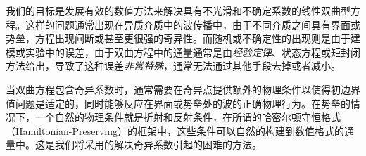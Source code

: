我们的目标是发展有效的数值方法来解决具有不光滑和不确定系数的线性双曲型方程。这样的问题通常出现在异质介质中的波传播中，由于不同介质之间具有界面或势垒，方程出现间断或甚至更很强的奇异性。而随机或不确定性的出现则是由于建模或实验中的误差，由于双曲方程中的通量通常是由{\it 经验定律}、状态方程或矩封闭方法给出，导致了这种误差{\it 非常特殊}，通常无法通过其他手段去掉或者减小。


当双曲方程包含奇异系数时，通常需要在奇异点提供额外的物理条件以使得初边界值问题是适定的，同时能够反应在界面或势垒处的波的正确物理行为。在势垒的情况下，一个自然的物理条件就是折射和反射条件，在所谓的哈密尔顿守恒格式（Hamiltonian-Preserving）的框架中，这些条件可以自然的构建到数值格式的通量中。这是我们将采用的解决奇异系数引起的困难的方法。


